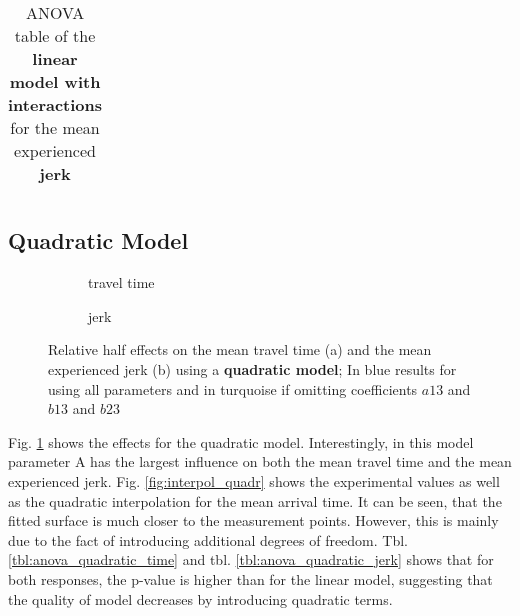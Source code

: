 \begin{table}[h!]
	\centering

	\begin{tabular}{l r r r r r}
	
	\end{tabular}



	\caption{ANOVA table of the \textbf{linear model with interactions} for the mean experienced \textbf{jerk}}\label{tbl:anova_lin_interactions_jerk}
\end{table}



\subsection{Quadratic Model}

\begin{figure}[h]
    \centering
    \begin{subfigure}[b]{0.5\textwidth}
	    \setlength{\abovecaptionskip}{1pt plus 3pt minus 0pt}
	    
	    \caption{travel time}
	\end{subfigure}
    \begin{subfigure}[b]{0.5\textwidth}
		\setlength{\abovecaptionskip}{1pt plus 3pt minus 0pt}	
	    
   	    \caption{jerk}
	\end{subfigure}
	
    \caption{Relative half effects on the mean travel time (a) and the mean experienced jerk (b) using a \textbf{quadratic model}; In blue results for using all parameters and in turquoise if omitting coefficients $a13$ and $b13$ and $b23$}\label{fig:effects_quadr}
\end{figure} 


Fig. \ref{fig:effects_quadr} shows the effects for the quadratic model. Interestingly, in this model parameter A has the largest influence on both the mean travel time and the mean experienced jerk. Fig. \ref{fig:interpol_quadr} shows the experimental values as well as the quadratic interpolation for the mean arrival time. It can be seen, that the fitted surface is much closer to the measurement points. However, this is mainly due to the fact of introducing additional degrees of freedom. Tbl. \ref{tbl:anova_quadratic_time} and tbl. \ref{tbl:anova_quadratic_jerk} shows that for both responses, the p-value is higher than for the linear model, suggesting that the quality of model decreases by introducing quadratic terms.

